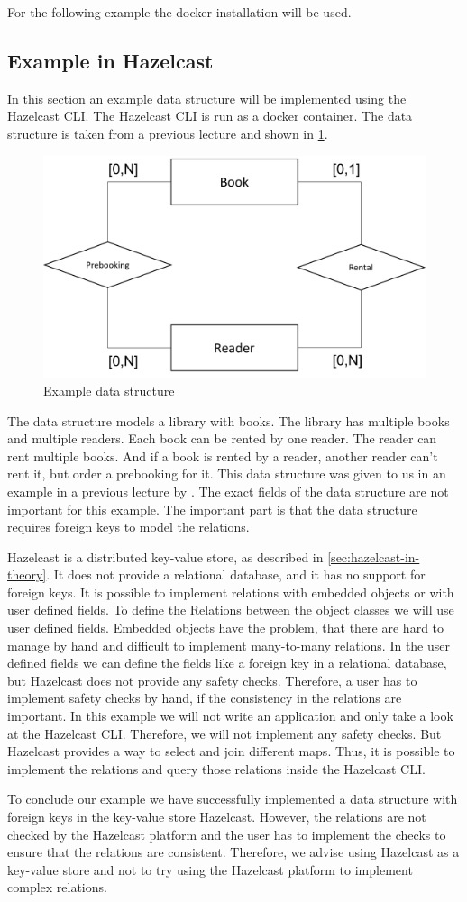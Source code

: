 For the following example the docker installation will be used. 

\subsection{Example in Hazelcast}
In this section an example data structure will be implemented using the Hazelcast
CLI. The Hazelcast CLI is run as a docker container. 
The data structure is taken from a previous lecture and shown in
\cref{fig:datastructure}.
\begin{figure}[h]
    \centering
    \includegraphics[width=.5\linewidth]{images/Datastructure.png}
    \caption{Example data structure \parencite[see also][]{mairhofer_aufgabe_2021}}
    \label{fig:datastructure}
\end{figure}
The data structure models a library with books. The library has multiple books
and multiple readers. Each book can be rented by one reader. The reader can rent
multiple books. And if a book is rented by a reader, another reader can't rent
it, but order a prebooking for it. This data structure was given to us in an
example in a previous lecture by \textcite{mairhofer_aufgabe_2021}. The exact
fields of the data structure are not important for this example. The important
part is that the data structure requires foreign keys to model the relations.

Hazelcast is a distributed key-value store, as described in
\cref{sec:hazelcast-in-theory}. It does not provide a relational database, and it
has no support for foreign keys. It is possible to implement relations with
embedded objects or with user defined fields. To define the Relations between
the object classes we will use user defined fields. Embedded objects have the
problem, that there are hard to manage by hand and difficult to implement
many-to-many relations. In the user defined fields we can define the fields like
a foreign key in a relational database, but Hazelcast does not provide any
safety checks. Therefore, a user has to implement safety checks by hand, if the
consistency in the relations are important. In this example we will not write an
application and only take a look at the Hazelcast CLI. Therefore, we will not
implement any safety checks. But Hazelcast provides a way to select and join
different maps. Thus, it is possible to implement the relations and query those
relations inside the Hazelcast CLI. 

To conclude our example we have successfully implemented a data structure with
foreign keys in the key-value store Hazelcast. However, the relations are not
checked by the Hazelcast platform and the user has to implement the checks to
ensure that the relations are consistent. Therefore, we advise using Hazelcast
as a key-value store and not to try using the Hazelcast platform to implement
complex relations. 
